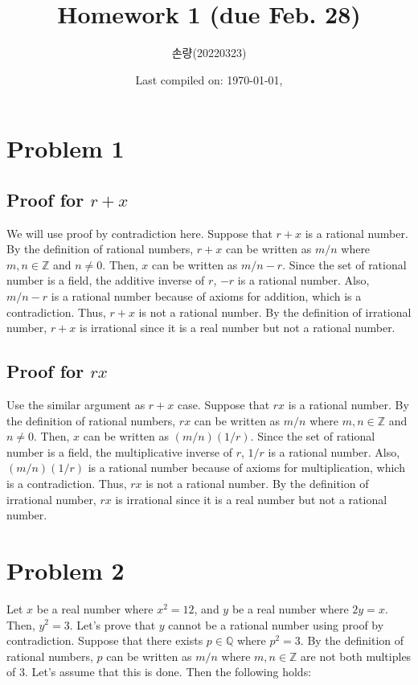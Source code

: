 \documentclass{scrartcl}
\title{Homework 1 (due Feb. 28)}
\author{손량(20220323)}
\date{Last compiled on: \today, \currenttime}
\begin{document}
\maketitle

\section{Problem 1}
\subsection{Proof for \(r + x\)}
We will use proof by contradiction here. Suppose that \(r + x\) is a rational number. By the definition of rational numbers, \(r + x\) can be written as \(m / n\) where \(m, n \in \mathbb{Z}\) and \(n \not= 0\). Then, \(x\) can be written as \(m / n - r\). Since the set of rational number is a field, the additive inverse of \(r\), \(-r\) is a rational number. Also, \(m / n - r\) is a rational number because of axioms for addition, which is a contradiction. Thus, \(r + x\) is not a rational number. By the definition of irrational number, \(r + x\) is irrational since it is a real number but not a rational number.

\subsection{Proof for \(rx\)}
Use the similar argument as \(r + x\) case. Suppose that \(rx\) is a rational number. By the definition of rational numbers, \(rx\) can be written as \(m / n\) where \(m, n \in \mathbb{Z}\) and \(n \not= 0\). Then, \(x\) can be written as \((m / n)(1 / r)\). Since the set of rational number is a field, the multiplicative inverse of \(r\), \(1 / r\) is a rational number. Also, \((m / n)(1 / r)\) is a rational number because of axioms for multiplication, which is a contradiction. Thus, \(rx\) is not a rational number. By the definition of irrational number, \(rx\) is irrational since it is a real number but not a rational number.

\section{Problem 2}
Let \(x\) be a real number where \(x^2 = 12\), and \(y\) be a real number where \(2y = x\). Then, \(y^2 = 3\). Let's prove that \(y\) cannot be a rational number using proof by contradiction. Suppose that there exists \(p \in \mathbb{Q}\) where \(p^2 = 3\). By the definition of rational numbers, \(p\) can be written as \(m / n\) where \(m, n \in \mathbb{Z}\) are not both multiples of 3. Let's assume that this is done. Then the following holds:
\end{document}
